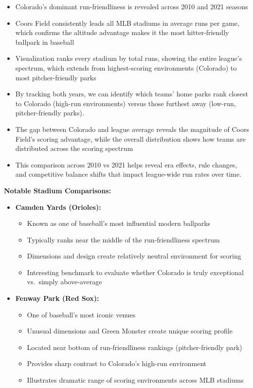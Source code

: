\documentclass[
  letterpaper,
  DIV=11,
  numbers=noendperiod]{scrartcl}
\providecommand{\tightlist}{%
  \setlength{\itemsep}{0pt}\setlength{\parskip}{0pt}}
\begin{document}
\begin{tcolorbox}
\begin{itemize}
\tightlist
\item
  Colorado's dominant run-friendliness is revealed across 2010 and 2021
  seasons
\item
  Coors Field consistently leads all MLB stadiums in average runs per
  game, which confirms the altitude advantage makes it the most
  hitter-friendly ballpark in baseball
\item
  Visualization ranks every stadium by total runs, showing the entire
  league's spectrum, which extends from highest-scoring environments
  (Colorado) to most pitcher-friendly parks
\item
  By tracking both years, we can identify which teams' home parks rank
  closest to Colorado (high-run environments) versus those furthest away
  (low-run, pitcher-friendly parks).
\item
  The gap between Colorado and league average reveals the magnitude of
  Coors Field's scoring advantage, while the overall distribution shows
  how teams are distributed across the scoring spectrum
\item
  This comparison across 2010 vs 2021 helps reveal era effects, rule
  changes, and competitive balance shifts that impact league-wide run
  rates over time.
\end{itemize}

\textbf{Notable Stadium Comparisons:}

\begin{itemize}
\tightlist
\item
  \textbf{Camden Yards (Orioles):}

  \begin{itemize}
  \tightlist
  \item
    Known as one of baseball's most influential modern ballparks
  \item
    Typically ranks near the middle of the run-friendliness spectrum
  \item
    Dimensions and design create relatively neutral environment for
    scoring
  \item
    Interesting benchmark to evaluate whether Colorado is truly
    exceptional vs.~simply above-average
  \end{itemize}
\item
  \textbf{Fenway Park (Red Sox):}

  \begin{itemize}
  \tightlist
  \item
    One of baseball's most iconic venues
  \item
    Unusual dimensions and Green Monster create unique scoring profile
  \item
    Located near bottom of run-friendliness rankings (pitcher-friendly
    park)
  \item
    Provides sharp contrast to Colorado's high-run environment
  \item
    Illustrates dramatic range of scoring environments across MLB
    stadiums
  \end{itemize}
\end{itemize}


\end{tcolorbox}
\end{document}
